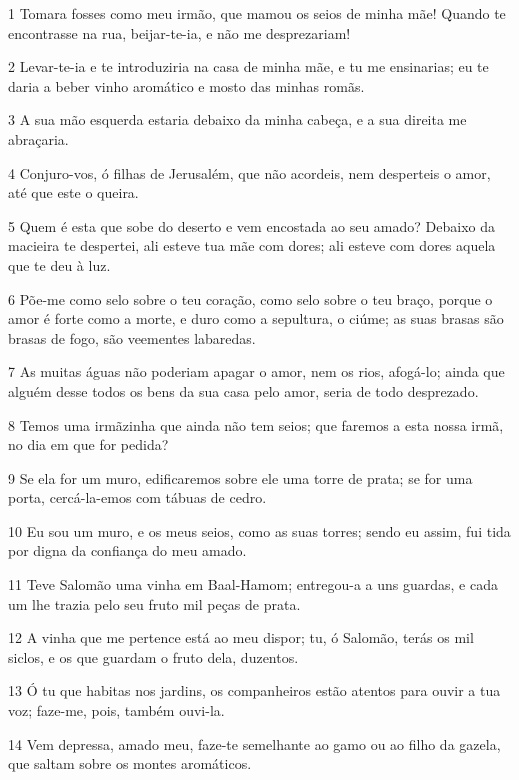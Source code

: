 \par 1 Tomara fosses como meu irmão, que mamou os seios de minha mãe! Quando te encontrasse na rua, beijar-te-ia, e não me desprezariam!
\par 2 Levar-te-ia e te introduziria na casa de minha mãe, e tu me ensinarias; eu te daria a beber vinho aromático e mosto das minhas romãs.
\par 3 A sua mão esquerda estaria debaixo da minha cabeça, e a sua direita me abraçaria.
\par 4 Conjuro-vos, ó filhas de Jerusalém, que não acordeis, nem desperteis o amor, até que este o queira.
\par 5 Quem é esta que sobe do deserto e vem encostada ao seu amado? Debaixo da macieira te despertei, ali esteve tua mãe com dores; ali esteve com dores aquela que te deu à luz.
\par 6 Põe-me como selo sobre o teu coração, como selo sobre o teu braço, porque o amor é forte como a morte, e duro como a sepultura, o ciúme; as suas brasas são brasas de fogo, são veementes labaredas.
\par 7 As muitas águas não poderiam apagar o amor, nem os rios, afogá-lo; ainda que alguém desse todos os bens da sua casa pelo amor, seria de todo desprezado.
\par 8 Temos uma irmãzinha que ainda não tem seios; que faremos a esta nossa irmã, no dia em que for pedida?
\par 9 Se ela for um muro, edificaremos sobre ele uma torre de prata; se for uma porta, cercá-la-emos com tábuas de cedro.
\par 10 Eu sou um muro, e os meus seios, como as suas torres; sendo eu assim, fui tida por digna da confiança do meu amado.
\par 11 Teve Salomão uma vinha em Baal-Hamom; entregou-a a uns guardas, e cada um lhe trazia pelo seu fruto mil peças de prata.
\par 12 A vinha que me pertence está ao meu dispor; tu, ó Salomão, terás os mil siclos, e os que guardam o fruto dela, duzentos.
\par 13 Ó tu que habitas nos jardins, os companheiros estão atentos para ouvir a tua voz; faze-me, pois, também ouvi-la.
\par 14 Vem depressa, amado meu, faze-te semelhante ao gamo ou ao filho da gazela, que saltam sobre os montes aromáticos.


